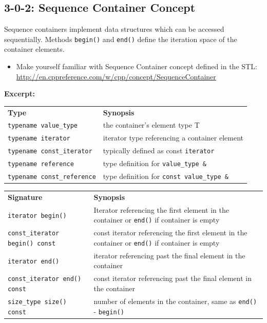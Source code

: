 \begin{homeworkProblem}[3-0: Prerequisites]
    \subsection{3-0-2: Sequence Container Concept}
    Sequence containers implement data structures which can be accessed sequentially. Methods \texttt{begin()} and \texttt{end()} define the iteration space of the container elements.
    \begin{itemize}
        \item Make yourself familiar with Sequence Container concept defined in the STL: \\\url{http://en.cppreference.com/w/cpp/concept/SequenceContainer}
    \end{itemize}
    \textbf{Excerpt:}
    \begin{table}[h!]
        \label{tab:table1}
        \begin{tabular}{ll}
          \textbf {Type} & \textbf{Synopsis} \\
          \texttt{typename      value\_type}    &   the container’s element type T \\
          \texttt{typename        iterator}     &  	iterator type referencing a container element \\
          \texttt{typename  const\_iterator}    &  	typically defined as const \texttt{iterator} \\
          \texttt{typename       reference}     & 	type definition for \texttt{value\_type \&} \\
          \texttt{typename const\_reference}    &  	type definition for \texttt{const value\_type \&}
        \end{tabular}
    \end{table}
    \begin{table}[http]
        \label{tab:table2}
        \begin{tabularx}{\textwidth}{lX}
          \textbf {Signature} & \textbf{Synopsis} \\
          \texttt{iterator begin()}                 & Iterator referencing the first element in the container or \texttt{end()} if  container is empty\\
          \texttt{const\_iterator begin()  const}    & const iterator referencing the first element in the container or \texttt{end()} if container is empty\\
          \texttt{iterator end()}                   & iterator referencing past the final element in the container\\
          \texttt{const\_iterator end()    const}    & const iterator referencing past the final element in the container\\
          \texttt{size\_type size()        const}    & 	number of elements in the container, same as \texttt{end()} - \texttt{begin()}
        \end{tabularx}
    \end{table}
\end{homeworkProblem}
